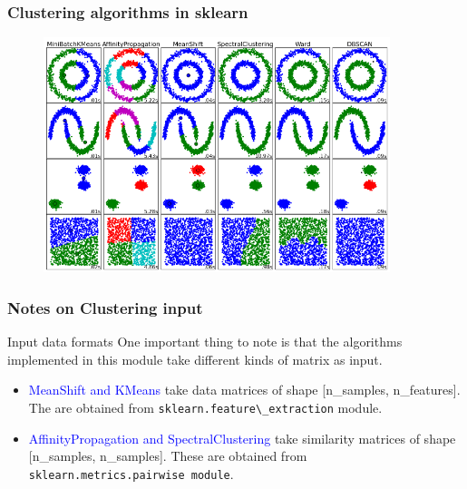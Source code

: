 \documentclass[10pt, colorlinks]{beamer}
\begin{document}
\begin{frame}[fragile]
\begin{center}

\end{center}
\end{frame}


\begin{frame}[fragile]\frametitle{Clustering algorithms in sklearn}
\begin{figure}[!htb]
    \centering
    \includegraphics[width=0.9\textwidth]{figs/clustering}
\end{figure}
\end{frame}
\begin{frame}[fragile]\frametitle{Notes on Clustering input}
\begin{block}{Input data formats}
One important thing to note is that the algorithms implemented in this module take different kinds of matrix as input.
    \begin{itemize}
    \item \textcolor{blue}{MeanShift and KMeans} take data matrices of shape [n\_samples, n\_features]. The are obtained from  \verb|sklearn.feature\_extraction| module. 
    \item \textcolor{blue}{AffinityPropagation and SpectralClustering} take similarity matrices of shape [n\_samples, n\_samples]. These are obtained from  \verb|sklearn.metrics.pairwise module|. 
    \end{itemize} 
\end{block}

\end{frame}
\end{document}
